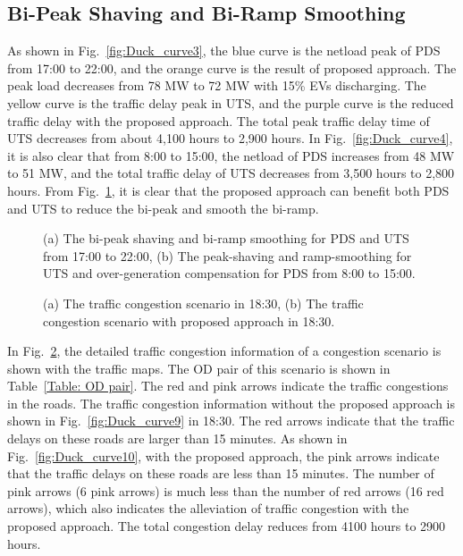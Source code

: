 \documentclass[final]{IEEEtran}
\begin{document}
\subsection{Bi-Peak Shaving and Bi-Ramp Smoothing}
As shown in Fig.~\ref{fig:Duck_curve3}, the blue curve is the netload peak of PDS from 17:00 to 22:00, and the orange curve is the result of proposed approach. The peak load decreases from 78 MW to 72 MW with 15\% EVs discharging. The yellow curve is the traffic delay peak in UTS, and the purple curve is the reduced traffic delay with the proposed approach. The total peak traffic delay time of UTS decreases from about 4,100 hours to 2,900 hours. In Fig.~\ref{fig:Duck_curve4}, it is also clear that from 8:00 to 15:00, the netload of PDS increases from 48 MW to 51 MW, and the total traffic delay of UTS decreases from 3,500 hours to 2,800 hours. From Fig.~\ref{fig:Duck_curve5}, it is clear that the proposed approach can benefit both PDS and UTS to reduce the bi-peak and smooth the bi-ramp.

\begin{figure}[!t]
	\begin{center}
		\caption{(a) The bi-peak shaving and bi-ramp smoothing for PDS and UTS from 17:00 to 22:00, (b) The peak-shaving and ramp-smoothing for UTS and over-generation compensation for PDS from 8:00 to 15:00.}\label{fig:Duck_curve5}
	\end{center}
\end{figure}
\begin{figure}[!t]
	\begin{center}
		\caption{(a) The traffic congestion scenario in 18:30, (b) The traffic congestion scenario with proposed approach in 18:30.}\label{fig:Duck_curve8}
	\end{center}
\end{figure}

In Fig.~\ref{fig:Duck_curve8}, the detailed traffic congestion information of a congestion scenario is shown with the traffic maps. The OD pair of this scenario is shown in Table~\ref{Table: OD pair}. The red and pink arrows indicate the traffic congestions in the roads. The traffic congestion information without the proposed approach is shown in Fig.~\ref{fig:Duck_curve9} in 18:30. The red arrows indicate that the traffic delays on these roads are larger than 15 minutes. As shown in Fig.~\ref{fig:Duck_curve10}, with the proposed approach, the pink arrows indicate that the traffic delays on these roads are less than 15 minutes. The number of pink arrows (6 pink arrows) is much less than the number of red arrows (16 red arrows), which also indicates the alleviation of traffic congestion with the proposed approach. The total congestion delay reduces from 4100 hours to 2900 hours.
\end{document}
